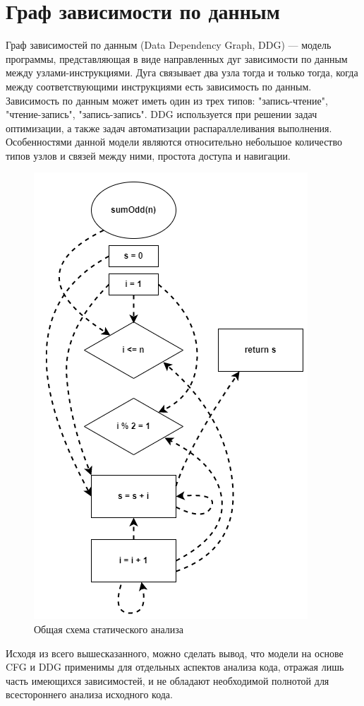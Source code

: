 \section{Граф зависимости по данным} \label{ch1:sec2-abbr3}
Граф зависимостей по данным (Data Dependency Graph, DDG) — модель программы, представляющая в виде направленных дуг зависимости по данным между узлами-инструкциями. Дуга связывает два узла тогда и только тогда, когда между соответствующими инструкциями есть зависимость по данным. Зависимость по данным может иметь один из трех типов: "запись-чтение", "чтение-запись", "запись-запись".
DDG используется при решении задач оптимизации, а также задач автоматизации распараллеливания выполнения. Особенностями данной модели являются относительно небольшое количество типов узлов и связей между ними, простота доступа и навигации.
\begin{figure}[ht!] 
	\center
	\includegraphics [scale=1] {my_folder/images/my/4}
	\caption{Общая схема статического анализа } 
	\label{fig:4}  
\end{figure}
Исходя из всего вышесказанного, можно сделать вывод, что модели на основе CFG и DDG применимы для отдельных аспектов анализа кода, отражая лишь часть имеющихся зависимостей, и не обладают необходимой полнотой для всестороннего анализа исходного кода.
